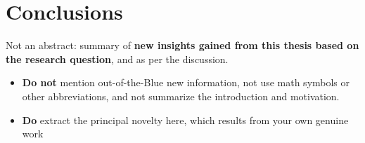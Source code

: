 \chapter{Conclusions}
\label{ch:conclusion}

Not an abstract: summary of \textbf{new insights gained from this thesis based on the research question}, and as per the discussion.\vspace{1em}

\begin{itemize}
	\item \textbf{Do not} mention out-of-the-Blue new information, not use math symbols or other abbreviations, and not summarize the introduction and motivation.
	\item \textbf{Do} extract the principal novelty here, which results from your own genuine work
\end{itemize}

